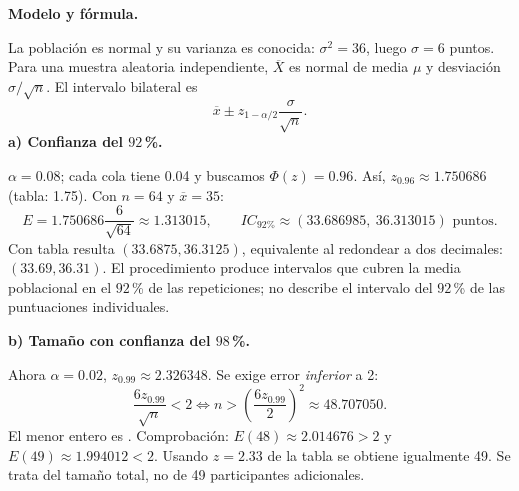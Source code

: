 \textbf{Modelo y fórmula.}\par\nopagebreak[4]
La población es normal y su varianza es conocida: $\sigma^2=36$, luego $\sigma=6$ puntos. Para una muestra aleatoria independiente, $\overline X$ es normal de media $\mu$ y desviación $\sigma/\sqrt n$. El intervalo bilateral es
\[
\overline x\pm z_{1-\alpha/2}\frac{\sigma}{\sqrt n}.
\]
\textbf{a) Confianza del $92$\,\%.}\par\nopagebreak[4]
$\alpha=0.08$; cada cola tiene 0.04 y buscamos $\Phi(z)=0.96$. Así, $z_{0.96}\approx1.750686$ (tabla: 1.75). Con $n=64$ y $\overline x=35$:
\[
E=1.750686\frac6{\sqrt{64}}\approx1.313015,\qquad
\boxed{IC_{\text{92\%}}\approx(33.686985,\ 36.313015)\text{ puntos}.}
\]
Con tabla resulta $(33.6875,36.3125)$, equivalente al redondear a dos decimales: $(33.69,36.31)$. El procedimiento produce intervalos que cubren la media poblacional en el $92$\,\% de las repeticiones; no describe el intervalo del $92$\,\% de las puntuaciones individuales.

\textbf{b) Tamaño con confianza del $98$\,\%.}\par\nopagebreak[4]
Ahora $\alpha=0.02$, $z_{0.99}\approx2.326348$. Se exige error \emph{inferior} a 2:
\[
\frac{6z_{0.99}}{\sqrt n}<2
\iff n>\left(\frac{6z_{0.99}}2\right)^2
\approx48.707050.
\]
El menor entero es . Comprobación: $E(48)\approx2.014676>2$ y $E(49)\approx1.994012<2$. Usando $z=2.33$ de la tabla se obtiene igualmente 49. Se trata del tamaño total, no de 49 participantes adicionales.
